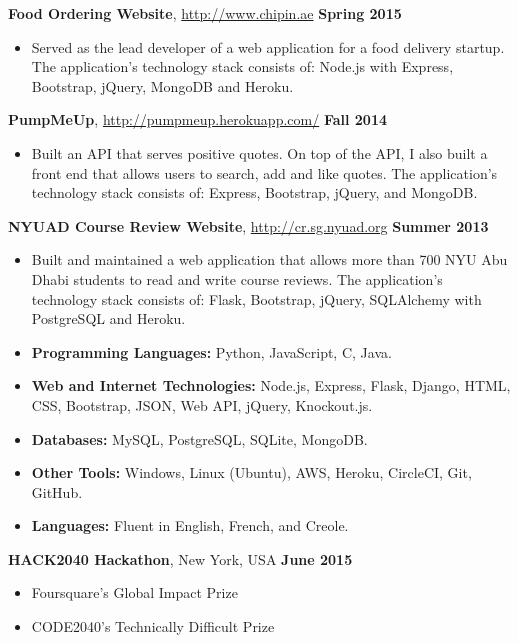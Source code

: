 \documentclass[11pt]{article} %
\begin{document}
\vspace{0.05in}

\noindent \centerline{\normalsize \textbf{Food Ordering Website}, \url{http://www.chipin.ae} \hfill \textbf{Spring 2015}}
\begin{itemize}
  \item Served as the lead developer of a web application for a food delivery startup. The application's technology stack consists of: Node.js with Express, Bootstrap, jQuery, MongoDB and Heroku.
\end{itemize}
\noindent \centerline{\normalsize \textbf{PumpMeUp}, \url{http://pumpmeup.herokuapp.com/} \hfill \textbf{Fall 2014}}
\begin{itemize}\itemsep-0.2em
  \item Built an API that serves positive quotes. On top of the API, I also built a front end that allows users to search, add and like quotes. The application's technology stack consists of: Express, Bootstrap, jQuery, and MongoDB.
\end{itemize}
\noindent \centerline{\normalsize \textbf{NYUAD Course Review Website}, \url{http://cr.sg.nyuad.org} \hfill \textbf{Summer 2013}}
\begin{itemize}\itemsep-0.2em
  \item Built and maintained a web application that allows more than 700 NYU Abu Dhabi students to read and write course reviews. The application's technology stack consists of: Flask, Bootstrap, jQuery, SQLAlchemy with PostgreSQL and Heroku.
\end{itemize}
\medskip

\begin{itemize}\itemsep-0.2em
  \item \textbf{Programming Languages:} Python, JavaScript, C, Java.
  \item \textbf{Web and Internet Technologies:} Node.js, Express, Flask, Django, HTML, CSS, Bootstrap, JSON, Web API, jQuery, Knockout.js.
  \item \textbf{Databases:} MySQL, PostgreSQL, SQLite, MongoDB.
  \item \textbf{Other Tools:} Windows, Linux (Ubuntu), AWS, Heroku, CircleCI, Git, GitHub.
  \item \textbf{Languages:} Fluent in English, French, and Creole.
\end{itemize}
\medskip

 \medskip

\noindent \centerline{\normalsize  \textbf {HACK2040 Hackathon}, New York, USA \hfill \textbf{June 2015}}
\begin{itemize}\itemsep-0.35em
  \item Foursquare's Global Impact Prize
  \item CODE2040's Technically Difficult Prize
\end{itemize}
\end{document}
